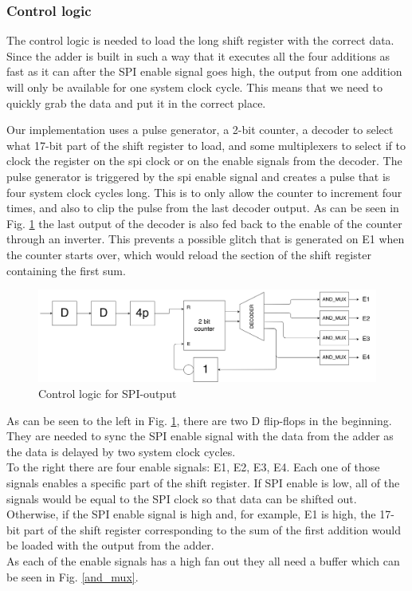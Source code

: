 \newpage

\subsubsection{Control logic}
The control logic is needed to load the long shift register with the correct data. Since the adder is built in such a way that it executes all the four additions as fast as it can after the SPI enable signal goes high, the output from one addition will only be available for one system clock cycle. This means that we need to quickly grab the data and put it in the correct place.
 
Our implementation uses a pulse generator, a 2-bit counter, a decoder to select what 17-bit part of the shift register to load, and some multiplexers to select if to clock the register on the spi clock or on the enable signals from the decoder. The pulse generator is triggered by the spi enable signal and creates a pulse that is four system clock cycles long. This is to only allow the counter to increment four times, and also to clip the pulse from the last decoder output. As can be seen in Fig. \ref{spi_out} the last output of the decoder is also fed back to the enable of the counter through an inverter. This prevents a possible glitch that is generated on E1 when the counter starts over, which would reload the section of the shift register containing the first sum. \\

\begin{figure}[H]
\centering
\captionsetup{justification=centering}
\includegraphics[scale=0.075]{../figures/spi_control.png}
\caption{Control logic for SPI-output}
\label{spi_out}
\end{figure}

\raggedright As can be seen to the left in Fig. \ref{spi_out}, there are two D flip-flops in the beginning. They are needed to sync the SPI enable signal with the data from the adder as the data is delayed by two system clock cycles.\\
To the right there are four enable signals: E1, E2, E3, E4. Each one of those signals enables a specific part of the shift register. If SPI enable is low, all of the signals would be equal to the SPI clock so that data can be shifted out. Otherwise, if the SPI enable signal is high and, for example, E1 is high, the 17-bit part of the shift register corresponding to the sum of the first addition would be loaded with the output from the adder. \\
As each of the enable signals has a high fan out they all need a buffer which can be seen in Fig. \ref{and_mux}.

